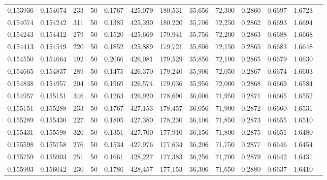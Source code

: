 \begin{tabular}{rrrrrrrrrrrrr}
0.153936 & 0.154074 &   233 &  50 &                                     0.1767 & 425,079 & 180,531 &  35,656 &  72,300 & 0.2860 & 0.6697 & 1.6723 \\
0.154074 & 0.154242 &   311 &  50 &                                     0.1385 & 425,390 & 180,220 &  35,706 &  72,250 & 0.2862 & 0.6693 & 1.6694 \\
0.154243 & 0.154412 &   279 &  50 &                                     0.1520 & 425,669 & 179,941 &  35,756 &  72,200 & 0.2863 & 0.6688 & 1.6668 \\
0.154413 & 0.154549 &   220 &  50 &                                     0.1852 & 425,889 & 179,721 &  35,806 &  72,150 & 0.2865 & 0.6683 & 1.6648 \\
0.154550 & 0.154664 &   192 &  50 &                                     0.2066 & 426,081 & 179,529 &  35,856 &  72,100 & 0.2865 & 0.6679 & 1.6630 \\
0.154665 & 0.154837 &   289 &  50 &                                     0.1475 & 426,370 & 179,240 &  35,906 &  72,050 & 0.2867 & 0.6674 & 1.6603 \\
0.154838 & 0.154957 &   204 &  50 &                                     0.1969 & 426,574 & 179,036 &  35,956 &  72,000 & 0.2868 & 0.6669 & 1.6584 \\
0.154957 & 0.155151 &   346 &  50 &                                     0.1263 & 426,920 & 178,690 &  36,006 &  71,950 & 0.2871 & 0.6665 & 1.6552 \\
0.155151 & 0.155288 &   233 &  50 &                                     0.1767 & 427,153 & 178,457 &  36,056 &  71,900 & 0.2872 & 0.6660 & 1.6531 \\
0.155289 & 0.155430 &   227 &  50 &                                     0.1805 & 427,380 & 178,230 &  36,106 &  71,850 & 0.2873 & 0.6655 & 1.6510 \\
0.155431 & 0.155598 &   320 &  50 &                                     0.1351 & 427,700 & 177,910 &  36,156 &  71,800 & 0.2875 & 0.6651 & 1.6480 \\
0.155598 & 0.155758 &   276 &  50 &                                     0.1534 & 427,976 & 177,634 &  36,206 &  71,750 & 0.2877 & 0.6646 & 1.6454 \\
0.155759 & 0.155903 &   251 &  50 &                                     0.1661 & 428,227 & 177,383 &  36,256 &  71,700 & 0.2879 & 0.6642 & 1.6431 \\
0.155903 & 0.156042 &   230 &  50 &                                     0.1786 & 428,457 & 177,153 &  36,306 &  71,650 & 0.2880 & 0.6637 & 1.6410 \\

\end{tabular}
